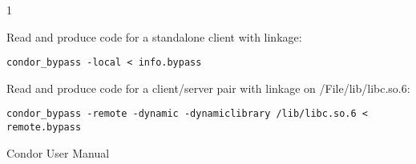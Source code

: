 \begin{ManPage}{\label{man-condor-bypass}}{1}
\Examples

Read  and produce code for a standalone client with  linkage:
\begin{verbatim}
condor_bypass -local < info.bypass
\end{verbatim}

Read  and produce code for a client/server pair with  linkage on /File{/lib/libc.so.6}:
\begin{verbatim}
condor_bypass -remote -dynamic -dynamiclibrary /lib/libc.so.6 < remote.bypass
\end{verbatim}

\SeeAlso
Condor User Manual

\end{ManPage}

